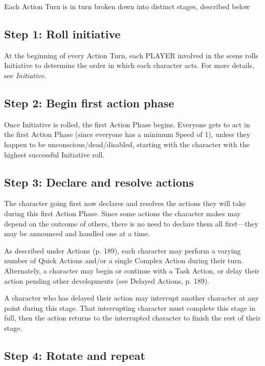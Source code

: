 Each Action Turn is in turn broken down into distinct stages, described below


\subsection{Step 1: Roll initiative}
\label{sec:roll-initiative}

At the beginning of every Action Turn, each PLAYER involved in the scene rolls Initiative to determine the order in which each character acts. For more details, see \emph{Initiative}.


\subsection{Step 2: Begin first action phase}
\label{sec:begin-first-phase}

Once Initiative is rolled, the first Action Phase begins. Everyone gets to act in the first Action Phase (since everyone has a minimum Speed of 1), unless they happen to be unconscious/dead/disabled, starting with the character with the highest successful Initiative roll.


\subsection{Step 3: Declare and resolve actions}
\label{sec:declare-resolve}

The character going first now declares and resolves the actions they will take during this first Action Phase. Since some actions the character makes may depend on the outcome of others, there is no need to declare them all first—they may be announced and handled one at a time.

As described under Actions (p. 189), each character may perform a varying number of Quick Actions and/or a single Complex Action during their turn. Alternately, a character may begin or continue with a Task Action, or delay their action pending other developments (see Delayed Actions, p. 189).

A character who has delayed their action may interrupt another character at any point during this stage. That interrupting character must complete this stage in full, then the action returns to the interrupted character to finish the rest of their stage.


\subsection{Step 4: Rotate and repeat}
\label{sec:rotate-repeat}

